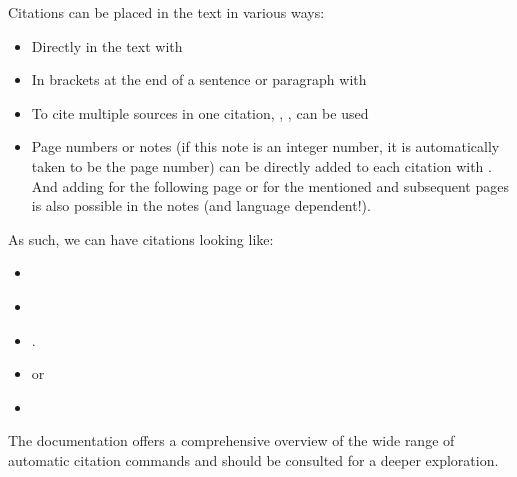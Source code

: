 Citations can be placed in the text in various ways:
\begin{itemize}
    \item Directly in the text with 
    \item In brackets at the end of a sentence or paragraph with 
    \item To cite multiple sources in one citation, \fakeverb{\cites{}}, \fakeverb{\textcites{}}, \fakeverb{\parencites{}} can be used
    \item Page numbers or notes (if this note is an integer number, it is
          automatically taken to be the page number) can be directly added to each citation with \fakeverb{[]}. And adding \fakeverb{\psq} for the following page or \fakeverb{\psqq} for the mentioned and subsequent pages is also possible in the notes (and language dependent!).
\end{itemize}

\clearpage
As such, we can have citations looking like:
\begin{itemize}
    \item \cite{einstein1905}
    \item \cites{einstein1905, diracPrinciplesQuantumMechanics1981}
    \item \cites[8]{einstein1905}[29\psqq]{goossensLaTeXCompanion1993}[2-9]{knuthTeXbook1986}[89\psq]{knuthFundamentalAlgorithms1973}{diracPrinciplesQuantumMechanics1981}.
    \item \parencites{baehrThermodynamikGrundlagenUnd2016,birdNaturalLanguageProcessing2009} or \parencites(vgl.)()[15\psq]{baehrThermodynamikGrundlagenUnd2016}[132\psqq]{birdNaturalLanguageProcessing2009}
    \item \textcites[5]{baehrThermodynamikGrundlagenUnd2016}[50-56]{dubbelTaschenbuchFurMaschinenbau2007}
\end{itemize}

The documentation offers a comprehensive overview of the wide range of automatic citation commands and should be consulted for a deeper exploration.

